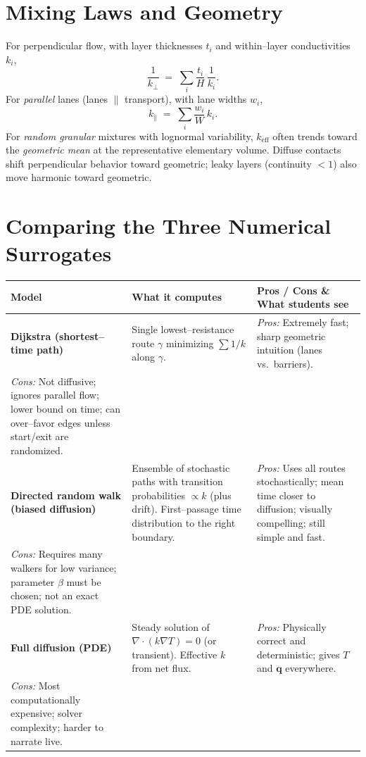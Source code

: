 \documentclass[11pt,a4paper]{article}
\begin{document}
\section{Mixing Laws and Geometry}
For perpendicular flow, with layer thicknesses $t_i$ and within--layer conductivities $k_i$,
\[
    \frac{1}{k_{\perp}} \;=\; \sum_i \frac{t_i}{H}\,\frac{1}{k_i}.
\]
For \emph{parallel} lanes (lanes $\parallel$ transport), with lane widths $w_i$,
\[
    k_{\parallel} \;=\; \sum_i \frac{w_i}{W}\,k_i.
\]
For \emph{random granular} mixtures with lognormal variability, $k_{\text{eff}}$ often trends toward the \emph{geometric mean} at the representative elementary volume. Diffuse contacts shift perpendicular behavior toward geometric; leaky layers (continuity $<1$) also move harmonic toward geometric.

\section{Comparing the Three Numerical Surrogates}
\begin{center}
\renewcommand{\arraystretch}{1.25}
\begin{tabular}{@{}p{3.1cm}p{5.0cm}p{5.5cm}@{}}
    \toprule
    \textbf{Model} & \textbf{What it computes} & \textbf{Pros / Cons \& What students see} \\
    \midrule
    \textbf{Dijkstra (shortest--time path)} &
    Single lowest--resistance route $\gamma$ minimizing $\sum 1/k$ along $\gamma$. &
    \emph{Pros:} Extremely fast; sharp geometric intuition (lanes vs.\ barriers).\\
    \emph{Cons:} Not diffusive; ignores parallel flow; lower bound on time; can over--favor edges unless start/exit are randomized. \\
    \midrule
    \textbf{Directed random walk (biased diffusion)} &
    Ensemble of stochastic paths with transition probabilities $\propto k$ (plus drift). First--passage time distribution to the right boundary. &
    \emph{Pros:} Uses all routes stochastically; mean time closer to diffusion; visually compelling; still simple and fast.\\
    \emph{Cons:} Requires many walkers for low variance; parameter $\beta$ must be chosen; not an exact PDE solution. \\
    \midrule
    \textbf{Full diffusion (PDE)} &
    Steady solution of $\nabla\!\cdot(k\nabla T)=0$ (or transient). Effective $k$ from net flux. &
    \emph{Pros:} Physically correct and deterministic; gives $T$ and $\mathbf q$ everywhere.\\
    \emph{Cons:} Most computationally expensive; solver complexity; harder to narrate live. \\
    \bottomrule
\end{tabular}
\end{center}
\end{document}
